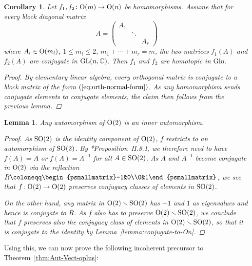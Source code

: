 \documentclass[reqno]{memo-l}
\theoremstyle{mythm}
\newtheorem{lemma}[thm]{Lemma}
\newtheorem{cor}[thm]{Corollary}
\theoremstyle{definition}
\numberwithin{equation}{section}
\newcommand{\C} {{\mathbb{C}}}
\newcommand{\GL}{{\textup{GL}}}
\renewcommand{\O}{{\textup{O}}}
\newcommand{\SO}{{\textup{SO}}}
\newcommand{\Glo}{\textup{Glo}}
\begin{document}
\begin{cor}\label{cor:uniqueness-maps-to-O(n)}
    Let $f_1,f_2\colon \O(m)\to \O(n)$ be homomorphisms. Assume that for every block diagonal matrix
    \begin{equation}\label{eq:orth-normal-form}
        A=\begin{pmatrix}
            A_1\\
            &\ddots\\
            &&A_r
        \end{pmatrix}
    \end{equation}
    where $A_i\in \O(m_i)$, $1\le m_i\le 2$, $m_1+\cdots+m_r=m$, the two matrices $f_1(A)$ and $f_2(A)$ are conjugate in $\GL(n,\C)$. Then $f_1$ and $f_2$ are homotopic in $\Glo$.
    \begin{proof}
        By elementary linear algebra, every orthogonal matrix is conjugate to a block matrix of the form $(\ref{eq:orth-normal-form})$. As any homomorphism sends conjugate elements to conjugate elements, the claim then follows from the previous lemma.
    \end{proof}
\end{cor}

\begin{lemma}
    Any automorphism of $\O(2)$ is an inner automorphism.
    \begin{proof}
        As $\SO(2)$ is the identity component of $\O(2)$, $f$ restricts to an automorphism of $\SO(2)$. By \cite{broecker-tom-dieck}*{Proposition~II.8.1}, we therefore need to have $f(A)=A$ or $f(A)=A^{-1}$ for all $A\in\SO(2)$. As $A$ and $A^{-1}$ become conjugate in $\O(2)$ via the reflection $R\coloneqq\begin{psmallmatrix}-1&0\\0&1\end{psmallmatrix}$, we see that $f\colon\O(2)\to\O(2)$ preserves conjugacy classes of elements in $\SO(2)$. 
        
        On the other hand, any matrix in $\O(2)\smallsetminus\SO(2)$ has $-1$ and $1$ as eigenvalues and hence is conjugate to $R$. As $f$ also has to preserve $\O(2)\smallsetminus\SO(2)$, we conclude that $f$ preserves also the conjugacy class of elements in $\O(2)\smallsetminus\SO(2)$, so that it is conjugate to the identity by Lemma~\ref{lemma:conjugate-to-On}.
    \end{proof}
\end{lemma}

Using this, we can now prove the following incoherent precursor to Theorem~\ref{thm:Aut-Vect-oplus}:
\end{document}
